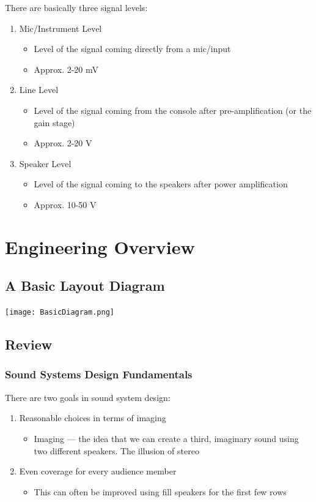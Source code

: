 \documentclass[a4paper]{article}
\begin{document}
There are basically three signal levels:
\begin{enumerate}
	\item Mic/Instrument Level
		\begin{itemize}
			\item Level of the signal coming directly from a
				mic/input
			\item Approx. 2-20 mV
		\end{itemize}
	\item Line Level
		\begin{itemize}
			\item Level of the signal coming from the console after
				pre-amplification (or the gain stage)
			\item Approx. 2-20 V
		\end{itemize}
	\item Speaker Level
		\begin{itemize}
			\item Level of the signal coming to the speakers after
				power amplification
			\item Approx. 10-50 V
		\end{itemize}
\end{enumerate}



\section{Engineering Overview}
\subsection{A Basic Layout Diagram}
\texttt{[image: BasicDiagram.png]}

\subsection{Review}
\subsubsection{Sound Systems Design Fundamentals}
There are two goals in sound system design:
\begin{enumerate}
	\item Reasonable choices in terms of imaging
		\begin{itemize}
			\item Imaging --- the idea that we can create a third,
				imaginary sound using two different speakers.
				The illusion of stereo
		\end{itemize}
	\item Even coverage for every audience member
		\begin{itemize}
			\item This can often be improved using fill speakers
				for the first few rows
		\end{itemize}
\end{enumerate}
\end{document}

